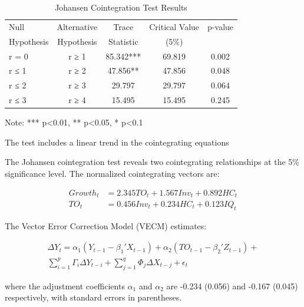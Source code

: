 \documentclass[12pt,a4paper]{article}
\theoremstyle{definition}
\begin{document}
\begin{table}[H]
\centering
\caption{Johansen Cointegration Test Results}
\begin{threeparttable}
\begin{tabular}{lcccc}
\toprule
Null & Alternative & Trace & Critical Value & p-value \\
Hypothesis & Hypothesis & Statistic & (5\%) & \\
\midrule
r = 0 & r ≥ 1 & 85.342*** & 69.819 & 0.002 \\
r ≤ 1 & r ≥ 2 & 47.856** & 47.856 & 0.048 \\
r ≤ 2 & r ≥ 3 & 29.797 & 29.797 & 0.064 \\
r ≤ 3 & r ≥ 4 & 15.495 & 15.495 & 0.245 \\
\bottomrule
\end{tabular}
\begin{tablenotes}
\small
\item Note: *** p<0.01, ** p<0.05, * p<0.1
\item The test includes a linear trend in the cointegrating equations
\end{tablenotes}
\end{threeparttable}
\end{table}

The Johansen cointegration test reveals two cointegrating relationships at the 5\% significance level. The normalized cointegrating vectors are:

\begin{equation}
\begin{split}
Growth_t &= 2.345TO_t + 1.567Inv_t + 0.892HC_t \\
TO_t &= 0.456Inv_t + 0.234HC_t + 0.123IQ_t
\end{split}
\end{equation}

The Vector Error Correction Model (VECM) estimates:

\begin{equation}
\begin{split}
\Delta Y_t = \alpha_1(Y_{t-1} - \beta_1'X_{t-1}) + \alpha_2(TO_{t-1} - \beta_2'Z_{t-1}) + \\
\sum_{i=1}^p \Gamma_i \Delta Y_{t-i} + \sum_{j=1}^q \Phi_j \Delta X_{t-j} + \epsilon_t
\end{split}
\end{equation}

where the adjustment coefficients $\alpha_1$ and $\alpha_2$ are -0.234 (0.056) and -0.167 (0.045) respectively, with standard errors in parentheses.
\end{document}
